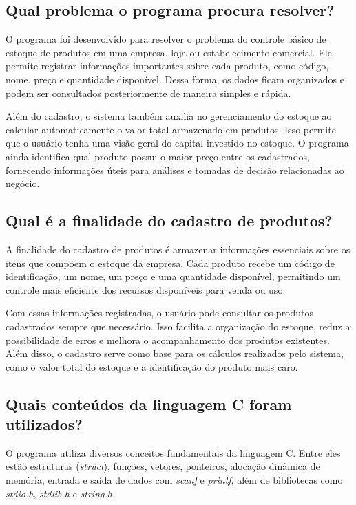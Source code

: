 \documentclass[12pt, a4paper, brazil]{article}
\begin{document}
\subsection{Qual problema o programa procura resolver?}

O programa foi desenvolvido para resolver o problema do controle básico de estoque de produtos em uma empresa, loja ou estabelecimento comercial. Ele permite registrar informações importantes sobre cada produto, como código, nome, preço e quantidade disponível. Dessa forma, os dados ficam organizados e podem ser consultados posteriormente de maneira simples e rápida.

Além do cadastro, o sistema também auxilia no gerenciamento do estoque ao calcular automaticamente o valor total armazenado em produtos. Isso permite que o usuário tenha uma visão geral do capital investido no estoque. O programa ainda identifica qual produto possui o maior preço entre os cadastrados, fornecendo informações úteis para análises e tomadas de decisão relacionadas ao negócio.


\subsection{Qual é a finalidade do cadastro de produtos?}

A finalidade do cadastro de produtos é armazenar informações essenciais sobre os itens que compõem o estoque da empresa. Cada produto recebe um código de identificação, um nome, um preço e uma quantidade disponível, permitindo um controle mais eficiente dos recursos disponíveis para venda ou uso.

Com essas informações registradas, o usuário pode consultar os produtos cadastrados sempre que necessário. Isso facilita a organização do estoque, reduz a possibilidade de erros e melhora o acompanhamento dos produtos existentes. Além disso, o cadastro serve como base para os cálculos realizados pelo sistema, como o valor total do estoque e a identificação do produto mais caro.

\subsection{Quais conteúdos da linguagem C foram utilizados?}

O programa utiliza diversos conceitos fundamentais da linguagem C. Entre eles estão estruturas (\textit{struct}), funções, vetores, ponteiros, alocação dinâmica de memória, entrada e saída de dados com \textit{scanf} e \textit{printf}, além de bibliotecas como \textit{stdio.h}, \textit{stdlib.h} e \textit{string.h}.
\end{document}
